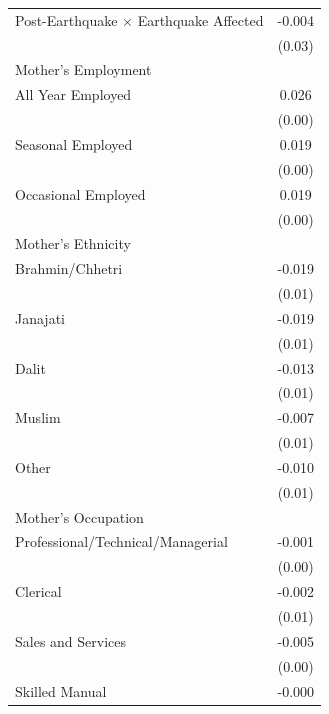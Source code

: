 \begin{longtable}{l*{1}{c}}
Post-Earthquake × Earthquake Affected & -0.004 \\
                    & (0.03) \\
\multicolumn{2}{l}{Mother's Employment} \\
\hspace{1em}All Year Employed & 0.026\sym{***} \\
                    & (0.00) \\
\hspace{1em}Seasonal Employed & 0.019\sym{***} \\
                    & (0.00) \\
\hspace{1em}Occasional Employed & 0.019\sym{***} \\
                    & (0.00) \\
\multicolumn{2}{l}{Mother's Ethnicity} \\
\hspace{1em}Brahmin/Chhetri & -0.019 \\
                    & (0.01) \\
\hspace{1em}Janajati & -0.019 \\
                    & (0.01) \\
\hspace{1em}Dalit & -0.013 \\
                    & (0.01) \\
\hspace{1em}Muslim & -0.007 \\
                    & (0.01) \\
\hspace{1em}Other & -0.010 \\
                    & (0.01) \\
\multicolumn{2}{l}{Mother's Occupation} \\
\hspace{1em}Professional/Technical/Managerial & -0.001 \\
                    & (0.00) \\
\hspace{1em}Clerical & -0.002 \\
                    & (0.01) \\
\hspace{1em}Sales and Services & -0.005 \\
                    & (0.00) \\
\hspace{1em}Skilled Manual & -0.000 \\

\end{longtable}
